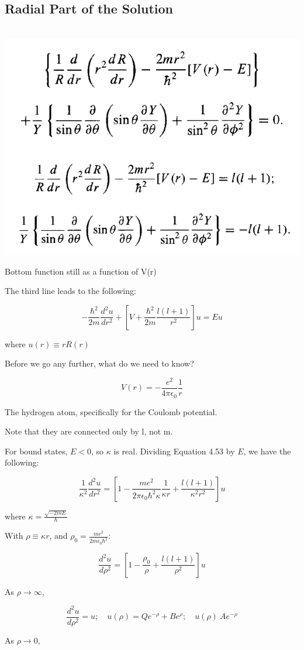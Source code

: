 \documentclass{article}
\begin{document}
\subsection{Radial Part of the Solution}

\
\includegraphics[width = 0.6 \textwidth]{Lecture20/3.png}

Bottom function still as a function of V(r)


The third line leads to the following:

$$- \frac{\hbar^2}{2m} \frac{d^2 u}{dr^2} + \left[ V + \frac{\hbar^2}{2m} \frac{l(l+1)}{r^2} \right] u = Eu$$

where $u(r) \equiv r R(r)$

Before we go any further, what do we need to know?

$$V(r) = - \frac{e^2}{4 \pi \epsilon_0} \frac{1}{r}$$

The hydrogen atom, specifically for the Coulomb potential.  

Note that they are connected only by l, not m. 

For bound states, $E < 0$, so $\kappa$ is real. Dividing Equation 4.53 by $E$, we have the following:

$$\frac{1}{\kappa^2} \frac{d^2 u}{dr^2} = \left[ 1 - \frac{me^2}{2 \pi \epsilon_0 \hbar^2 \kappa} \frac{1}{\kappa r} + \frac{l(l+1)}{\kappa^2 r^2} \right] u$$

where $\kappa = \frac{\sqrt{-2mE}}{\hbar}$

With $\rho \equiv \kappa r$, and $\rho_0 = \frac{me^2}{2m\epsilon_0 \hbar^2}$:

$$\frac{d^2 u}{d \rho^2} = \left[ 1 - \frac{\rho_0}{\rho} + \frac{l(l+1)}{\rho^2} \right] u$$

As $\rho \to \infty$, 

$$\frac{d^2 u}{d \rho^2} = u; \quad u(\rho) = Qe^{- \rho} + Be^\rho; \quad u(\rho) ~ Ae^{- \rho}$$

As $\rho \to 0$, 
\end{document}
